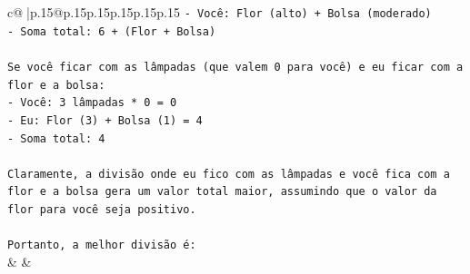 \documentclass{article}
\begin{document}
{\begin{supertabular}{c@{$\;$}|p{.15\linewidth}@{}p{.15\linewidth}p{.15\linewidth}p{.15\linewidth}p{.15\linewidth}p{.15\linewidth}}
{{{\texttt{{-} Você: Flor (alto) + Bolsa (moderado)} \\
\texttt{{-} Soma total: 6 + (Flor + Bolsa)} \\
\\ 
\texttt{Se você ficar com as lâmpadas (que valem 0 para você) e eu ficar com a flor e a bolsa:} \\
\texttt{{-} Você: 3 lâmpadas * 0 = 0} \\
\texttt{{-} Eu: Flor (3) + Bolsa (1) = 4} \\
\texttt{{-} Soma total: 4} \\
\\ 
\texttt{Claramente, a divisão onde eu fico com as lâmpadas e você fica com a flor e a bolsa gera um valor total maior, assumindo que o valor da flor para você seja positivo.} \\
\\ 
\texttt{Portanto, a melhor divisão é:} \\
            }
        }
    }
    & & \\ \\


\end{supertabular}}
\end{document}
